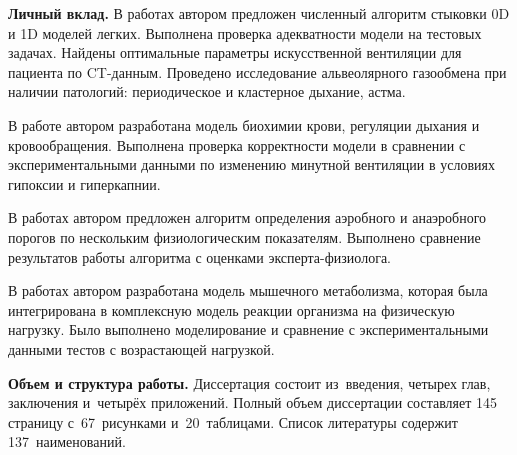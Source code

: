 \textbf{Личный вклад.}
В работах \cite{GolovComp2017,Simakov2015} автором предложен численный алгоритм стыковки 0D и 1D моделей легких. Выполнена проверка адекватности модели на тестовых задачах. Найдены оптимальные параметры искусственной вентиляции для пациента по CT-данным. Проведено исследование альвеолярного газообмена при наличии патологий: периодическое и кластерное дыхание, астма.

В работе \cite{GolovCmodel2017} автором разработана модель биохимии крови, регуляции дыхания и кровообращения. Выполнена проверка корректности модели в сравнении с экспериментальными данными по изменению минутной вентиляции в условиях гипоксии и гиперкапнии.

В работах \cite{GolovIt2017,GolovSp2016, TimmeSp2016} автором предложен алгоритм определения аэробного и анаэробного порогов по нескольким физиологическим показателям. Выполнено сравнение результатов работы алгоритма с оценками эксперта-физиолога.

В работах \cite{GolovSp2015,GolovEkb2016} автором разработана модель мышечного метаболизма, которая была интегрирована в комплексную модель реакции организма на физическую нагрузку. Было выполнено моделирование и сравнение с экспериментальными данными тестов с возрастающей нагрузкой.

\textbf{Объем и структура работы.} Диссертация состоит из~введения, четырех глав, заключения и~четырёх приложений. Полный объем диссертации составляет 145 страницу с~67~рисунками и~20~таблицами. Список литературы содержит 137~наименований.

\clearpage